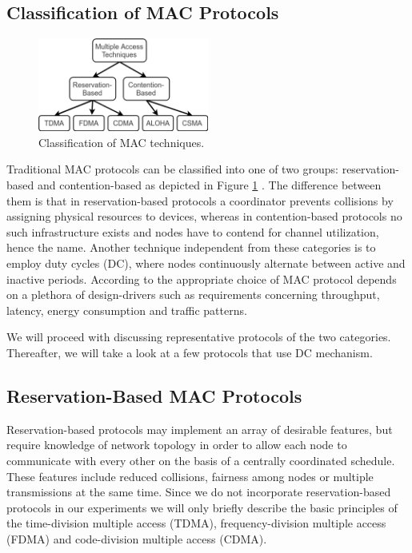 \subsection{Classification of MAC Protocols}

\begin{figure}[tb] \label{fig:mac-classification}
	\begin{center}
		\includegraphics[width=0.5\textwidth]{pictures/mac_classification}
	\end{center}
	\caption{Classification of MAC techniques.}
\end{figure}

Traditional MAC protocols can be classified into one of two groups: reservation-based and contention-based as depicted in Figure \ref{fig:mac-classification} \cite{Garg07}. The difference between them is that in reservation-based protocols a coordinator prevents collisions by assigning physical resources to devices, whereas in contention-based protocols no such infrastructure exists and nodes have to contend for channel utilization, hence the name. Another technique independent from these categories is to employ duty cycles (DC), where nodes continuously alternate between active and inactive periods. According to \cite{Bachir10} the appropriate choice of MAC protocol depends on a plethora of design-drivers such as requirements concerning throughput, latency, energy consumption and traffic patterns. 

We will proceed with discussing representative protocols of the two categories. Thereafter, we will take a look at a few protocols that use DC mechanism.

\subsection{Reservation-Based MAC Protocols}
\label{sec:reservation-mac}

Reservation-based protocols may implement an array of desirable features, but require knowledge of network topology in order to allow each node to communicate with every other on the basis of a centrally coordinated schedule. These features include reduced collisions, fairness among nodes or multiple transmissions at the same time. Since we do not incorporate reservation-based protocols in our experiments we will only briefly describe the basic principles of the time-division multiple access (TDMA), frequency-division multiple access (FDMA) and code-division multiple access (CDMA). 

